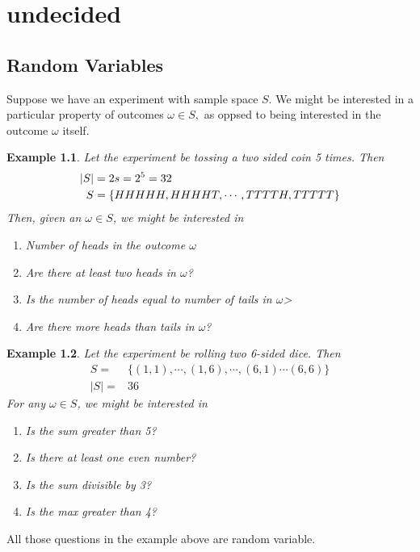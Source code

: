 \documentclass[11pt,oneside]{book}
\theoremstyle{newStyle}
\newtheorem{ex}{Example}[section]
\begin{document}
\chapter[undecided]{undecided}
\section[Random Variables]{Random Variables}
Suppose we have an experiment with sample space $S$. We might be interested in a particular property of outcomes $\omega \in S,$ as oppsed to being interested in the outcome $\omega$ itself.
\begin{ex}
Let the experiment be tossing a two sided coin 5 times. Then \begin{align*}
|S|&=2\time 2\time 2\time 2\time 2s=2^5=32\\
S&=\{HHHHH,HHHHT,\cdots,TTTTH,TTTTT\}
\end{align*}
Then, given an $\omega\in S$, we might be interested in \begin{enumerate}[itemsep=0pt, topsep=1pt, partopsep=0pt,label=(\alph*)]
\item Number of heads in the outcome $\omega$
\item Are there at least two heads in $\omega$?
\item Is the number of heads equal to number of tails in $\omega$>
\item Are there more heads than tails in $\omega$?
\end{enumerate}
\end{ex}
\begin{ex}
Let the experiment be rolling two 6-sided dice. Then \begin{align*}
S=&\{(1,1),\cdots,(1,6),\cdots,(6,1)\cdots (6,6)\}\\
|S|=&36
\end{align*}
For any $\omega \in S$, we might be interested in \begin{enumerate}
[itemsep=0pt, topsep=1pt, partopsep=0pt,label=(\alph*)]
\item Is the sum greater than 5?
\item Is there at least one even number?
\item Is the sum divisible by 3?
\item Is the max greater than 4?
\end{enumerate}
\end{ex}
All those questions in the example above are random variable.
\end{document}

